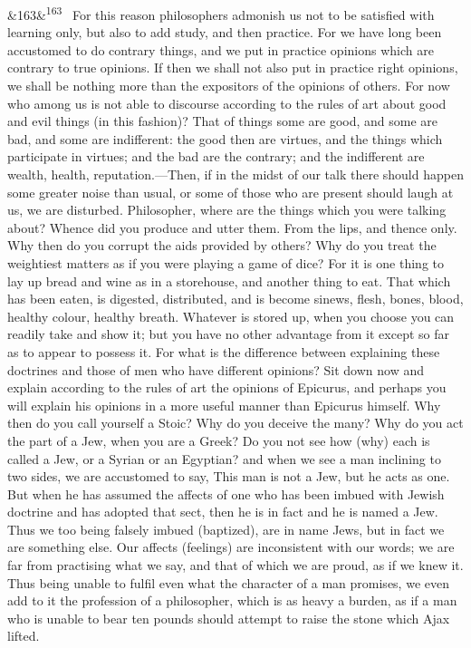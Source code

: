 \documentclass[12pt]{article}
\newcommand{\para}[1][]{\par\noindent\ifx&#1&\else\textsuperscript{\footnotesize #1}~\fi}
\begin{document}
\para[163] For this reason philosophers admonish us not to be satisfied with learning only, but also to add study, and then practice. For we have long been accustomed to do contrary things, and we put in practice opinions which are contrary to true opinions. If then we shall not also put in practice right opinions, we shall be nothing more than the expositors of the opinions of others. For now who among us is not able to discourse according to the rules of art about good and evil things (in this fashion)? That of things some are good, and some are bad, and some are indifferent: the good then are virtues, and the things which participate in virtues; and the bad are the contrary; and the indifferent are wealth, health, reputation.—Then, if in the midst of our talk there should happen some greater noise than usual, or some of those who are present should laugh at us, we are disturbed. Philosopher, where are the things which you were talking about? Whence did you produce and utter them. From the lips, and thence only. Why then do you corrupt the aids provided by others? Why do you treat the weightiest matters as if you were playing a game of dice? For it is one thing to lay up bread and wine as in a storehouse, and another thing to eat. That which has been eaten, is digested, distributed, and is become sinews, flesh, bones, blood, healthy colour, healthy breath. Whatever is stored up, when you choose you can readily take and show it; but you have no other advantage from it except so far as to appear to possess it. For what is the difference between explaining these doctrines and those of men who have different opinions? Sit down now and explain according to the rules of art the opinions of Epicurus, and perhaps you will explain his opinions in a more useful manner than Epicurus himself. Why then do you call yourself a Stoic? Why do you deceive the many? Why do you act the part of a Jew, when you are a Greek? Do you not see how (why) each is called a Jew, or a Syrian or an Egyptian? and when we see a man inclining to two sides, we are accustomed to say, This man is not a Jew, but he acts as one. But when he has assumed the affects of one who has been imbued with Jewish doctrine and has adopted that sect, then he is in fact and he is named a Jew. Thus we too being falsely imbued (baptized), are in name Jews, but in fact we are something else. Our affects (feelings) are inconsistent with our words; we are far from practising what we say, and that of which we are proud, as if we knew it. Thus being unable to fulfil even what the character of a man promises, we even add to it the profession of a philosopher, which is as heavy a burden, as if a man who is unable to bear ten pounds should attempt to raise the stone which Ajax lifted.
\end{document}
